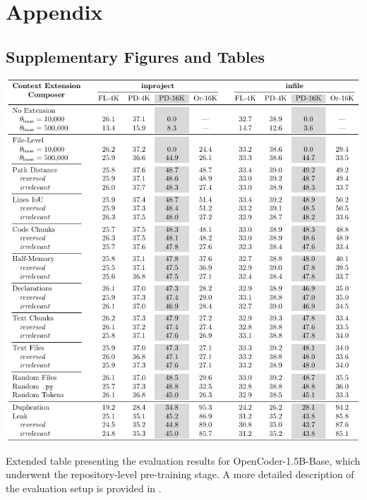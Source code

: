 \chapter{Appendix}

\section{Supplementary Figures and Tables}

\begin{table}[htbp]
    \centering
    \includegraphics[width=\textwidth]{tables/rq-b.pdf}
    \caption{Extended table presenting the evaluation results for OpenCoder-1.5B-Base, which underwent the repository-level pre-training stage. A more detailed description of the evaluation setup is provided in .}\label{tab:ocoder-extension-extended}
\end{table}

